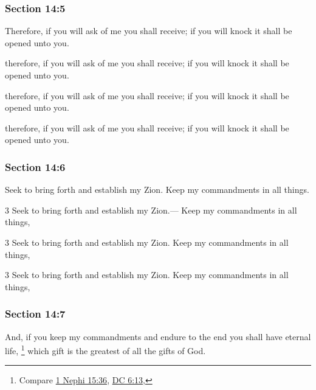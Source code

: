 	\subsubsection{Section 14:5} %
		\label{DC14-5}

		Therefore, if you will ask of me you shall receive; if you will knock it shall be opened unto you.

		\begin{framed}
		\scriptsize
			\begin{compactdesc}
				\item[JSP] therefore, if you will ask of me you shall receive; if you will knock it shall be opened unto you.
				\item[DC 1835] therefore, if you will ask of me you shall receive; if you will knock it shall be opened unto you.
				\item[DC 1844] therefore, if you will ask of me you shall receive; if you will knock it shall be opened unto you.
			\end{compactdesc}
		\end{framed}

	\subsubsection{Section 14:6} %
		\label{DC14-6}

		Seek to bring forth and establish my Zion.  Keep my commandments in all things.

		\begin{framed}
		\scriptsize
			\begin{compactdesc}
				\item[JSP] 3 Seek to bring forth and establish my Zion.--- Keep my commandments in all things, 
				\item[DC 1835] 3 Seek to bring forth and establish my Zion. Keep my commandments in all things, 
				\item[DC 1844] 3 Seek to bring forth and establish my Zion. Keep my commandments in all things,
			\end{compactdesc}
		\end{framed}

	\subsubsection{Section 14:7} %
		\label{DC14-7}

		And, if you keep my commandments and endure to the end you shall have eternal life,
			\footnote{%
				Compare \hyperref[1NEPHI-15-36]{1 Nephi 15:36}, \hyperref[DC6-13]{DC 6:13},
				}%
		which gift is the greatest of all the gifts of God.

